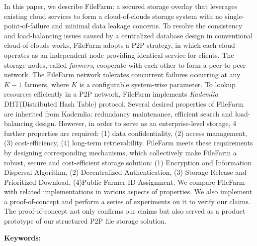 \begin{abstracten}
  In this paper, we describe FileFarm: a secured storage overlay that leverages existing cloud services to form a cloud-of-clouds storage system with no single-point-of-failure and minimal data leakage concerns. To resolve the consistency and load-balancing issues caused by a centralized database design in conventional cloud-of-clouds works, FileFarm adopts a P2P strategy, in which each cloud operates as an independent node providing identical service for clients. The storage nodes, called \textit{farmers}, cooperate with each other to form a peer-to-peer network. The FileFarm network tolerates concurrent failures occurring at any $K-1$ farmers, where $K$ is a configurable system-wise parameter. To lookup resources efficiently in a P2P network, FileFarm implements \textit{Kademlia} DHT(Distributed Hash Table) protocol\cite{maymounkov2002kademlia}. Several desired properties of FileFarm are inherited from Kademlia: redundancy maintenance, efficient search and load-balancing design. However, in order to serve as an enterprise-level storage, 4 further properties are required: (1) data confidentiality, (2) access management, (3) cost-efficiency, (4) long-term retrievability. FileFarm meets these requirements by designing corresponding mechanisms, which collectively  make FileFarm a robust, secure and cost-efficient storage solution: (1) Encryption and Information Dispersal Algorithm, (2) Decentralized Authentication, (3) Storage Release and Prioritized Download, (4)Public Farmer ID Assignment. We compare FileFarm with related implementations in various aspects of properties. We also implement a proof-of-concept and perform a series of experiments on it to verify our claims.  The proof-of-concept not only confirms our claims but also served as a product prototype of our structured P2P file storage solution.

\bigbreak
\noindent \textbf{Keywords:}{\, \makeatletter \@keywordsen \makeatother}
\end{abstracten}
